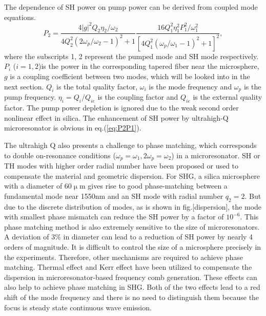 \documentclass[a4paper,12pt,hyperref]{article}
\begin{document}
The dependence of SH power on pump power can be derived from coupled mode equations\cite{haus1991coupled}.
\begin{equation}
P_2 = \frac{4|g|^2Q_2\eta_2/\omega_2}{4Q_2^2(2\omega_p/\omega_2-1)^2+1}\frac{16Q_1^2\eta_1^2P_1^2/\omega_1^2}{[4Q_1^2(\omega_p/\omega_1-1)^2+1]^2},
\label{eq:P2P1}
\end{equation}
where the subscripts 1, 2 represent the pumped mode and SH mode respectively. $P_i$ ($i=1, 2$)is the power in the corresponding tapered fiber near the microsphere, $g$ is a coupling coefficient between two modes, which will be looked into in the next section. $Q_i$ is the total quality factor, $\omega_i$ is the mode frequency and $\omega_p$ is the pump frequency. $\eta_{i}=Q_i/Q_{ie}$ is the coupling factor and $Q_{ie}$ is the external quality factor. The pump power depletion is ignored due to the weak second order nonlinear effect in silica. The enhancement of SH power by ultrahigh-Q microresonator is obvious in eq.(\ref{eq:P2P1}). 

The ultrahigh Q also presents a challenge to phase matching, which corresponds to double on-resonance conditions ($\omega_p = \omega_1, 2\omega_p = \omega_2$) in a microresonator\cite{carmon2007visible, kozyreff2008whispering, xu2008second, farnesi2014optical}. SH or TH modes with higher order radial number have been proposed or used to compensate the material and geometric dispersion\cite{carmon2007visible, kozyreff2008whispering, farnesi2014optical}. For SHG, a silica microsphere with a diameter of 60$\upmu$m gives rise to good phase-matching between a fundamental mode near 1550nm and an SH mode with radial number $q_2=2$. But due to the discrete distribution of modes, as is shown in fig.[dispersion], the mode with smallest phase mismatch can reduce the SH power by a factor of $10^{-6}$. This phase matching method is also extremely sensitive to the size of microresonators. A deviation of 3\% in diameter can lead to a reduction of SH power by nearly 4 orders of magnitude. It is difficult to control the size of a microsphere precisely in the experiments. Therefore, other mechanisms are required to achieve phase matching. Thermal effect and Kerr effect have been utilized to compensate the dispersion in microresonator-based frequency comb generation\cite{del2011octave, herr2014temporal}. These effects can also help to achieve phase matching in SHG. Both of the two effects lead to a red shift of the mode frequency \cite{ilchenko1992thermal, treussart1998evidence,  carmon2004dynamical, fomin2005nonstationary} and there is no need to distinguish them because the focus is steady state continuous wave emission. 
\end{document}
